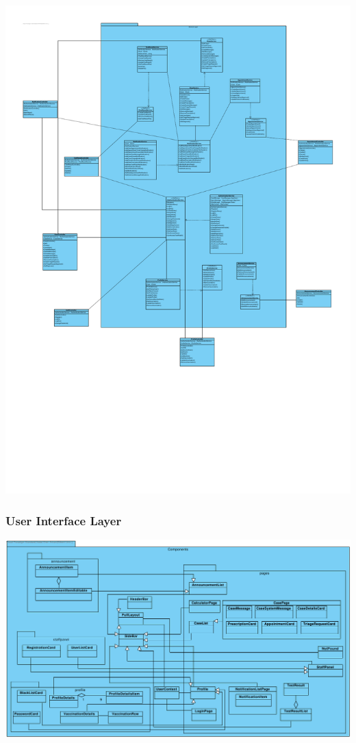 \documentclass[a4paper, 12pt, titlepage]{article}
\begin{document}
  \includegraphics[width=\linewidth]{businesslogic}

  \subsubsection{User Interface Layer}

  \includegraphics[width=\linewidth]{uisystem}
\end{document}
